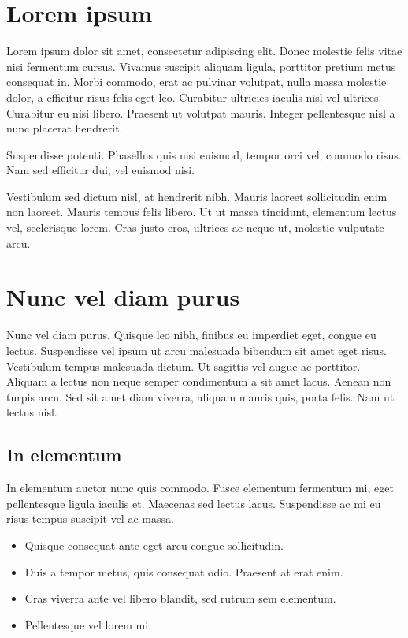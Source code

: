 \documentclass{ClassTeX}
\begin{document}
	\maketitle
	\section{Lorem ipsum}
	 Lorem ipsum dolor sit amet, consectetur adipiscing elit. Donec molestie felis vitae nisi fermentum cursus. Vivamus suscipit aliquam ligula, porttitor pretium metus consequat in. Morbi commodo, erat ac pulvinar volutpat, nulla massa molestie dolor, a efficitur risus felis eget leo. Curabitur ultricies iaculis nisl vel ultrices. Curabitur eu nisi libero. Praesent ut volutpat mauris. Integer pellentesque nisl a nunc placerat hendrerit.
	 
	 Suspendisse potenti. Phasellus quis nisi euismod, tempor orci vel, commodo risus. Nam sed efficitur dui, vel euismod nisi.
	 
	 Vestibulum sed dictum nisl, at hendrerit nibh. Mauris laoreet sollicitudin enim non laoreet. Mauris tempus felis libero. Ut ut massa tincidunt, elementum lectus vel, scelerisque lorem. Cras justo eros, ultrices ac neque ut, molestie vulputate arcu.
	 
	 \section{Nunc vel diam purus}
	 Nunc vel diam purus. Quisque leo nibh, finibus eu imperdiet eget, congue eu lectus. Suspendisse vel ipsum ut arcu malesuada bibendum sit amet eget risus. Vestibulum tempus malesuada dictum. Ut sagittis vel augue ac porttitor. Aliquam a lectus non neque semper condimentum a sit amet lacus. Aenean non turpis arcu. Sed sit amet diam viverra, aliquam mauris quis, porta felis. Nam ut lectus nisl.
	 \subsection{In elementum}
	 In elementum auctor nunc quis commodo. Fusce elementum fermentum mi, eget pellentesque ligula iaculis et. Maecenas sed lectus lacus. Suspendisse ac mi eu risus tempus suscipit vel ac massa. 
	 \begin{itemize}
	 	\item Quisque consequat ante eget arcu congue sollicitudin. 
	 	\item Duis a tempor metus, quis consequat odio. Praesent at erat enim. 
	 	\item Cras viverra ante vel libero blandit, sed rutrum sem elementum. 
	 	\item Pellentesque vel lorem mi. 
	 \end{itemize} 
	 
\end{document}
